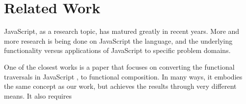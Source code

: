 \chapter{Related Work}

JavaScript, as a research topic, has matured greatly in recent years.  More and more research is being done on JavaScript the language, and the underlying functionality versus applications of JavaScript to specific problem domains.

One of the closest works is a paper that focuses on converting the functional traversals in JavaScript , to functional composition.  In many ways, it embodies the same concept as our work, but achieves the results through very different means.  It also requires 


